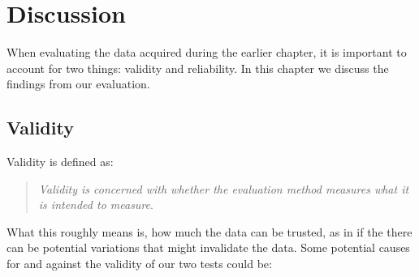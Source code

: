 \chapter{Discussion}
When evaluating the data acquired during the earlier chapter, it is important to account for two things: validity and reliability. In this chapter we discuss the findings from our evaluation.
\section*{Validity}
	Validity is defined as:\\
	\begin{quote}
		\textit{Validity is concerned with whether the evaluation method measures what it is intended to measure}\cite[p.~442~Box~13.3]{interactionDesign}.\\
	\end{quote}
	What this roughly means is, how much the data can be trusted, as in if the there can be potential variations that might invalidate the data. Some potential causes for and against the validity of our two tests could be:\\
